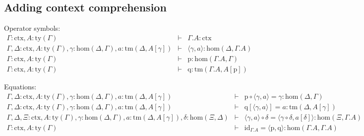 \documentclass[11pt,a4paper]{article}
\theoremstyle{definition}
\newcommand{\id}{\mathsf{id}}
\def\Hom{\mathrm{hom}}
\def\id{\mathrm{id}}
\newcommand{\ctx}{\mathrm{ctx}}
\newcommand{\ty}{\mathrm{ty}}
\newcommand{\tm}{\mathrm{tm}}
\newcommand{\tuple}[1]{\langle #1 \rangle}
\newcommand{\cext}{.}
\def\p{\mathrm{p}}
\def\q{\mathrm{q}}
\begin{document}

\subsection{Adding context comprehension}

\begin{tiny}
Operator symbols:
\begin{eqnarray*}
\Gamma : \ctx, A:\ty(\Gamma) &\vdash& \Gamma\cext A : \ctx\\
\Gamma,\Delta : \ctx, A:\ty(\Gamma), \gamma : \Hom(\Delta,\Gamma), a:\tm(\Delta,A[\gamma]) &\vdash& \tuple{\gamma,a} : \Hom(\Delta,\Gamma\cext A)\\
\Gamma : \ctx, A:\ty(\Gamma) &\vdash& \p: \Hom(\Gamma\cext A,\Gamma)\\
\Gamma : \ctx, A:\ty(\Gamma) &\vdash& \q: \tm(\Gamma\cext A,A[\p])
\end{eqnarray*}

Equations:
\begin{eqnarray*}
\Gamma,\Delta : \ctx, A:\ty(\Gamma), \gamma : \Hom(\Delta,\Gamma), a:\tm(\Delta,A[\gamma]) &\vdash& \p\circ\tuple{\gamma,a} = \gamma : \Hom(\Delta,\Gamma)\\
\Gamma,\Delta : \ctx, A:\ty(\Gamma), \gamma : \Hom(\Delta,\Gamma), a:\tm(\Delta,A[\gamma]) &\vdash& \q[\tuple{\gamma,a}] = a : \tm(\Delta,A[\gamma]) \\
\Gamma,\Delta,\Xi : \ctx, A:\ty(\Gamma), \gamma : \Hom(\Delta,\Gamma), a:\tm(\Delta,A[\gamma]), \delta : \Hom(\Xi,\Delta) &\vdash&
\tuple{\gamma,a} \circ \delta = \tuple{\gamma\circ\delta,a[\delta]} :
\Hom(\Xi,\Gamma\cext A) \\
\Gamma : \ctx, A:\ty(\Gamma) &\vdash&
\id_{\Gamma\cext A} = \tuple{\p,\q} : \Hom(\Gamma\cext A,\Gamma\cext A)
\end{eqnarray*}
\end{tiny}
\end{document}

